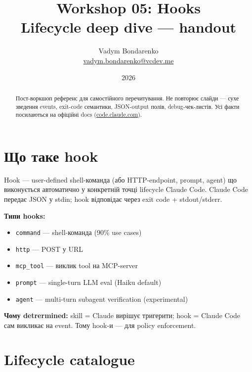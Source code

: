 \documentclass[11pt,a4paper]{article}
\title{%
  {\Huge\bfseries Workshop 05: Hooks}\\[0.6em]
  {\large Lifecycle deep dive --- handout}
}
\author{Vadym Bondarenko \\ \small\href{mailto:vadym.bondarenko@vcdev.me}{vadym.bondarenko@vcdev.me}}
\date{2026}
\begin{document}
\maketitle

\begin{abstract}
Пост-воркшоп референс для самостійного перечитування. Не повторює слайди --- сухе зведення events, exit-code семантики, JSON-output полів, debug-чек-листів. Усі факти посилаються на офіційні docs (\href{https://code.claude.com/docs/en/hooks}{code.claude.com}).
\end{abstract}

\tableofcontents
\newpage

\section{Що таке hook}

Hook --- user-defined shell-команда (або HTTP-endpoint, prompt, agent) що виконується автоматично у конкретній точці lifecycle Claude Code. Claude Code передає JSON у stdin; hook відповідає через exit code + stdout/stderr.

\textbf{Типи hooks:}
\begin{itemize}
\item \texttt{command} --- shell-команда (90\% use cases)
\item \texttt{http} --- POST у URL
\item \texttt{mcp\_tool} --- виклик tool на MCP-server
\item \texttt{prompt} --- single-turn LLM eval (Haiku default)
\item \texttt{agent} --- multi-turn subagent verification (experimental)
\end{itemize}

\textbf{Чому detrermined:} skill = Claude вирішує тригерити; hook = Claude Code сам викликає на event. Тому hook-и --- для policy enforcement.

\section{Lifecycle catalogue}
\end{document}
